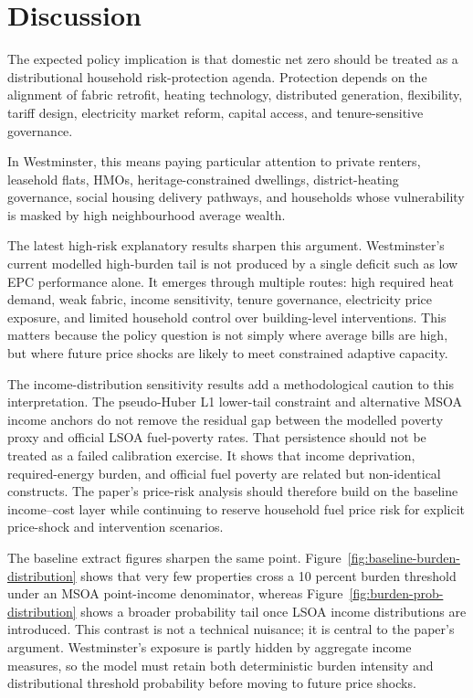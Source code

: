 \section{Discussion}

The expected policy implication is that domestic net zero should be treated as a distributional household risk-protection agenda. Protection depends on the alignment of fabric retrofit, heating technology, distributed generation, flexibility, tariff design, electricity market reform, capital access, and tenure-sensitive governance.

In Westminster, this means paying particular attention to private renters, leasehold flats, HMOs, heritage-constrained dwellings, district-heating governance, social housing delivery pathways, and households whose vulnerability is masked by high neighbourhood average wealth.

The latest high-risk explanatory results sharpen this argument. Westminster's current modelled high-burden tail is not produced by a single deficit such as low EPC performance alone. It emerges through multiple routes: high required heat demand, weak fabric, income sensitivity, tenure governance, electricity price exposure, and limited household control over building-level interventions. This matters because the policy question is not simply where average bills are high, but where future price shocks are likely to meet constrained adaptive capacity.

The income-distribution sensitivity results add a methodological caution to this interpretation. The pseudo-Huber L1 lower-tail constraint and alternative MSOA income anchors do not remove the residual gap between the modelled poverty proxy and official LSOA fuel-poverty rates. That persistence should not be treated as a failed calibration exercise. It shows that income deprivation, required-energy burden, and official fuel poverty are related but non-identical constructs. The paper's price-risk analysis should therefore build on the baseline income--cost layer while continuing to reserve household fuel price risk for explicit price-shock and intervention scenarios.

The baseline extract figures sharpen the same point. Figure~\ref{fig:baseline-burden-distribution} shows that very few properties cross a 10 percent burden threshold under an MSOA point-income denominator, whereas Figure~\ref{fig:burden-prob-distribution} shows a broader probability tail once LSOA income distributions are introduced. This contrast is not a technical nuisance; it is central to the paper's argument. Westminster's exposure is partly hidden by aggregate income measures, so the model must retain both deterministic burden intensity and distributional threshold probability before moving to future price shocks.

